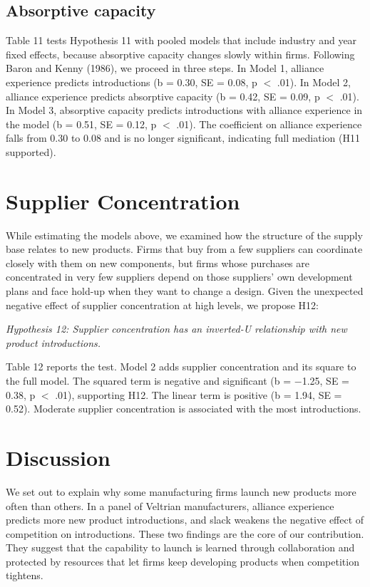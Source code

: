 \documentclass[12pt]{article}
\begin{document}
\subsection{Absorptive capacity}

Table 11 tests Hypothesis 11 with pooled models that include industry and year fixed effects, because absorptive capacity changes slowly within firms. Following Baron and Kenny (1986), we proceed in three steps. In Model 1, alliance experience predicts introductions (b = 0.30, SE = 0.08, p $<$ .01). In Model 2, alliance experience predicts absorptive capacity (b = 0.42, SE = 0.09, p $<$ .01). In Model 3, absorptive capacity predicts introductions with alliance experience in the model (b = 0.51, SE = 0.12, p $<$ .01). The coefficient on alliance experience falls from 0.30 to 0.08 and is no longer significant, indicating full mediation (H11 supported).

\section{Supplier Concentration}

While estimating the models above, we examined how the structure of the supply base relates to new products. Firms that buy from a few suppliers can coordinate closely with them on new components, but firms whose purchases are concentrated in very few suppliers depend on those suppliers' own development plans and face hold-up when they want to change a design. Given the unexpected negative effect of supplier concentration at high levels, we propose H12:

\textit{Hypothesis 12: Supplier concentration has an inverted-U relationship with new product introductions.}

Table 12 reports the test. Model 2 adds supplier concentration and its square to the full model. The squared term is negative and significant (b = $-$1.25, SE = 0.38, p $<$ .01), supporting H12. The linear term is positive (b = 1.94, SE = 0.52). Moderate supplier concentration is associated with the most introductions.

\section{Discussion}

We set out to explain why some manufacturing firms launch new products more often than others. In a panel of Veltrian manufacturers, alliance experience predicts more new product introductions, and slack weakens the negative effect of competition on introductions. These two findings are the core of our contribution. They suggest that the capability to launch is learned through collaboration and protected by resources that let firms keep developing products when competition tightens.
\end{document}
